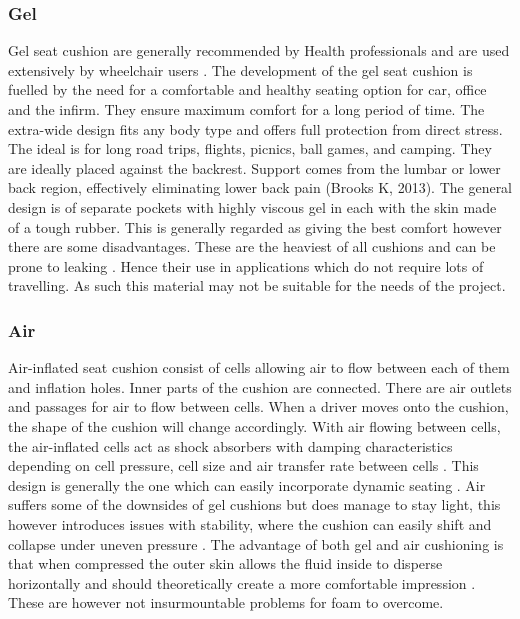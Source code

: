 \documentclass[conference]{IEEEtran}
\begin{document}
        \subsubsection{Gel}
        Gel seat cushion are generally recommended by Health professionals and are used extensively by wheelchair users \cite{Stockton2008}. The development of the gel seat cushion is fuelled by the need for a comfortable and healthy seating option for car, office and the infirm. They ensure maximum comfort for a long period of time. The extra-wide design fits any body type and offers full protection from direct stress. The ideal is for long road trips, flights, picnics, ball games, and camping. They are ideally placed against the backrest. Support comes from the lumbar or lower back region, effectively eliminating lower back pain (Brooks K, 2013). The general design is of separate pockets with highly viscous gel in each with the skin made of a tough rubber. This is generally regarded as giving the best comfort however there are some disadvantages. These are the heaviest of all cushions and can be prone to leaking \cite{Arthanat2006}. Hence their use in applications which do not require lots of travelling. As such this material may not be suitable for the needs of the project.
        
        \subsubsection{Air}
        Air-inflated seat cushion consist of cells allowing air to flow between each of them and inflation holes. Inner parts of the cushion are connected. There are air outlets and passages for air to flow between cells. When a driver moves onto the cushion, the shape of the cushion will change accordingly. With air flowing between cells, the air-inflated cells act as shock absorbers with damping characteristics depending on cell pressure, cell size and air transfer rate between cells \cite{Xinglei2010}. This design is generally the one which can easily incorporate dynamic seating \cite{BartramAssociatesLtd2015}. Air suffers some of the downsides of gel cushions but does manage to stay light, this however introduces issues with stability, where the cushion can easily shift and collapse under uneven pressure \cite{Arthanat2006}. The advantage of both gel and air cushioning is that when compressed the outer skin allows the fluid inside to disperse horizontally and should theoretically create a more comfortable impression \cite{Nigel2002}. These are however not insurmountable problems for foam to overcome.
        
\end{document}
